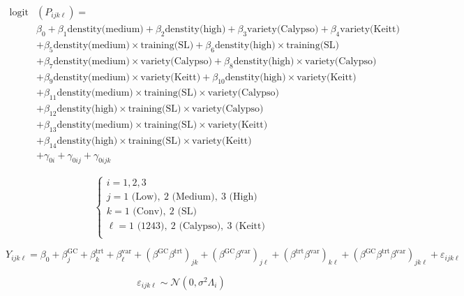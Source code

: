 \documentclass[a4paper, landscape, 11pt]{article}
\begin{document}
\newpage

\begin{align*}
 \text{logit}&\left( P_{ijk\ell} \right) =\\
 &\beta_0 +\beta_1 \text{denstity(medium)} + \beta_2 \text{denstity(high)} +\beta_3 \text{variety(Calypso)}  +\beta_4 \text{variety(Keitt)} \\
 &+\beta_5 \text{denstity(medium)} \times \text{training(SL)}  +\beta_6 \text{denstity(high)} \times \text{training(SL)}\\
 &+\beta_7 \text{denstity(medium)} \times \text{variety(Calypso)} +\beta_8 \text{denstity(high)} \times \text{variety(Calypso)}\\
 &+\beta_9 \text{denstity(medium)} \times \text{variety(Keitt)} +\beta_{10} \text{denstity(high)} \times \text{variety(Keitt)}\\
 & +\beta_{11} \text{denstity(medium)} \times \text{training(SL)} \times \text{variety(Calypso)} \\
 & +\beta_{12} \text{denstity(high)} \times \text{training(SL)} \times \text{variety(Calypso)} \\
 & +\beta_{13} \text{denstity(medium)} \times \text{training(SL)} \times \text{variety(Keitt)} \\
 & +\beta_{14} \text{denstity(high)} \times \text{training(SL)} \times \text{variety(Keitt)} \\
 & +\gamma_{0i} + \gamma_{0ij} + \gamma_{0ijk} 
\end{align*}

\newpage

\[
\begin{cases}
 i = 1, 2, 3\\
 j = 1 \text{ (Low)},\ 2 \text{ (Medium)},\ 3 \text{ (High)}\\
 k = 1\text{ (Conv)},\ 2\text{ (SL)}\\
 \ell = 1 \text{ (1243)},\ 2 \text{ (Calypso)}, \ 3 \text{ (Keitt)}\\
\end{cases}
\]

\newpage


\[
Y_{ijk\ell} = \beta_0 + \beta_j^{\text{GC}} + \beta_k^{\text{trt}} + \beta_\ell^{\text{var}} + \left( \beta^{\text{GC}}\beta^{\text{trt}} \right)_{jk} + \left( \beta^{\text{GC}}\beta^{\text{var}} \right)_{j\ell}
+ \left( \beta^{\text{trt}}\beta^{\text{var}} \right)_{k\ell} + \left( \beta^{\text{GC}}\beta^{\text{trt}}\beta^{\text{var}} \right)_{jk\ell} + \varepsilon_{ijk\ell}
\]

\vspace*{3cm}

\[
\varepsilon_{ijk\ell} \sim \mathcal{N}\left( 0, \sigma^2\Lambda_i \right)
\]
\end{document}
